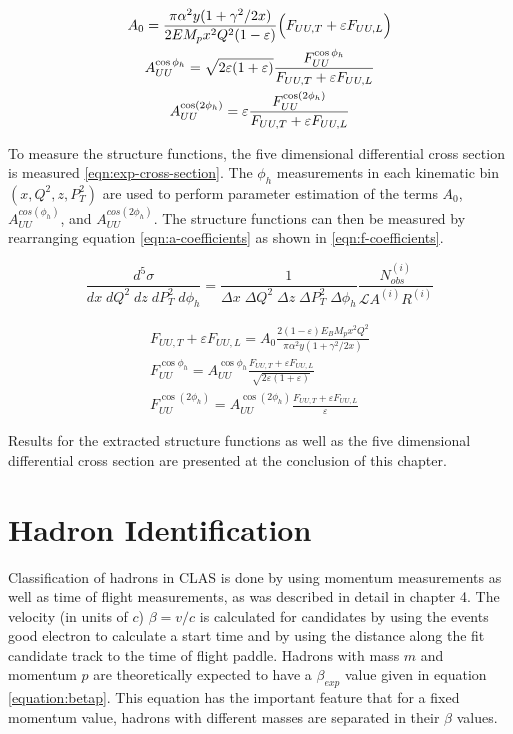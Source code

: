 \begin{gather}
	A_{0} = \frac{\pi \alpha^2 y (1+\gamma^2/2x)}{2 E M_p x^2 Q^2 (1-\varepsilon)} \Bigl( F_{UU,T} + \varepsilon F_{UU,L} \Bigr) \\
	A_{UU}^{\cos\phi_h} = \sqrt{2\varepsilon(1+\varepsilon)} \frac{F_{UU}^{\cos\phi_h}}{F_{UU,T} + \varepsilon F_{UU,L}} \\
	A_{UU}^{\cos(2\phi_h)} = \varepsilon \frac{F_{UU}^{\cos(2\phi_h)}}{F_{UU,T} + \varepsilon F_{UU,L}}
	\label{eqn:a-coefficients}
\end{gather}

To measure the structure functions, the five dimensional differential cross section is measured \ref{eqn:exp-cross-section}.  The $\phi_h$ measurements in each kinematic bin $(x, Q^2, z, P_T^2)$ are used to perform parameter estimation of the terms $A_{0}$, $A_{UU}^{cos(\phi_h)}$, and $A_{UU}^{cos(2\phi_h)}$.  The structure functions can then be measured by rearranging equation \ref{eqn:a-coefficients} as shown in \ref{eqn:f-coefficients}.

\begin{equation}
	\frac{d^5\sigma}{dx \; dQ^2 \; dz \; dP_T^2 \; d\phi_h} = \frac{1}{\Delta x \; \Delta Q^2 \; \Delta z \; \Delta P_T^2 \; \Delta \phi_h} \frac{N_{obs}^{(i)}}{\mathcal{L} A^{(i)} R^{(i)}} 
	\label{eqn:exp-cross-section}
\end{equation}

\begin{gather}
	\label{eqn:f-coefficients}
	F_{UU,T} + \varepsilon F_{UU,L} = A_0 \frac{2 (1-\varepsilon) E_B M_p x^2 Q^2}{\pi \alpha^2 y (1 + \gamma^2/2x)} \\
	F_{UU}^{\cos\phi_h} = A_{UU}^{\cos\phi_h}  \frac{ F_{UU,T} + \varepsilon F_{UU,L}}{\sqrt{2\varepsilon(1+\varepsilon)}} \\
	F_{UU}^{\cos(2\phi_h)} = A_{UU}^{\cos(2\phi_h)} \frac{ F_{UU,T} + \varepsilon F_{UU,L}}{\varepsilon}
\end{gather}

Results for the extracted structure functions as well as the five dimensional differential cross section are presented at the conclusion of this chapter.  

\section{Hadron Identification}
%
%

Classification of hadrons in CLAS is done by using momentum measurements as well as time of flight measurements, as was described in detail in chapter 4.  The velocity (in units of $c$) $\beta = v/c$ is calculated for candidates by using the events good electron to calculate a start time and by using the distance along the fit candidate track to the time of flight paddle.  Hadrons with mass $m$ and momentum $p$ are theoretically expected to have a $\beta_{exp}$ value given in equation \ref{equation:betap}.  This equation has the important feature that for a fixed momentum value, hadrons with different masses are separated in their $\beta$ values.

